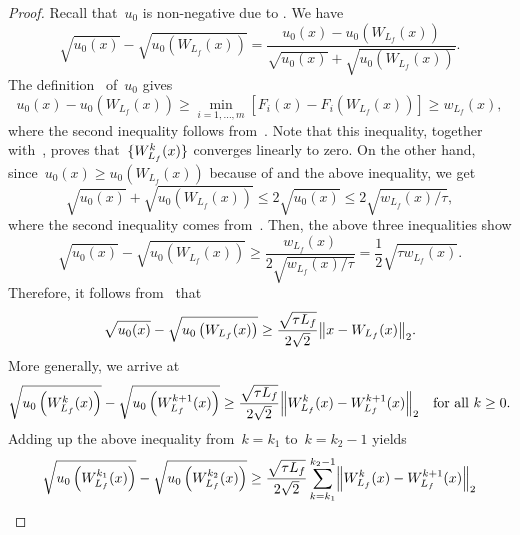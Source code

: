 \documentclass[../main]{subfiles}
\begin{document}
\begin{proof}
    Recall that~$u_0$ is non-negative due to .
    We have
    \begin{equation}
        \sqrt{u_0(x)} - \sqrt{u_0\left(W_{L_f}(x)\right)} = \frac{u_0(x) - u_0\left(W_{L_f}(x)\right)}{\sqrt{u_0(x)} + \sqrt{u_0\left(W_{L_f}(x)\right)}}
    .\end{equation}
    The definition~ of~$u_0$ gives
    \begin{equation}
        u_0(x) - u_0\left(W_{L_f}(x)\right) \ge \min_{i = 1, \dots, m} [F_i(x) - F_i\left(W_{L_f}(x)\right)] \ge w_{L_f}(x)
    ,\end{equation}
    where the second inequality follows from~.
    Note that this inequality, together with~, proves that~$\lbrace W_{L_f}^k(x)\rbrace$ converges linearly to zero.
    On the other hand, since~$u_0(x) \ge u_0\left(W_{L_f}(x)\right)$ because of  and the above inequality, we get
    \begin{equation}
        \sqrt{u_0(x)} + \sqrt{u_0\left(W_{L_f}(x)\right)} \le 2 \sqrt{u_0(x)} \le 2 \sqrt{w_{L_f}(x) / \tau}
    ,\end{equation}
    where the second inequality comes from~.
    Then, the above three inequalities show
    \begin{equation}
        \sqrt{u_0(x)} - \sqrt{u_0\left(W_{L_f}(x)\right)} \ge \frac{w_{L_f}(x)}{2 \sqrt{w_{L_f}(x) / \tau}} = \frac{1}{2} \sqrt{\tau w_{L_f}(x)}
    .\end{equation}
    Therefore, it follows from~ that
    \begin{equation}
        \sqrt{u_0(x)} - \sqrt{u_0\left(W_{L_f}(x)\right)} \ge \frac{\sqrt{\tau L_f}}{2 \sqrt{2}} \norm*{x - W_{L_f}(x)}_2
    .\end{equation}
    More generally, we arrive at
    \begin{equation}
        \sqrt{u_0\left(W_{L_f}^k(x)\right)} - \sqrt{u_0\left(W_{L_f}^{k + 1}(x)\right)} \ge \frac{\sqrt{\tau L_f}}{2 \sqrt{2}} \norm*{W_{L_f}^k(x) - W_{L_f}^{k + 1}(x)}_2 \forallcondition{k \ge 0}
    .\end{equation}
    Adding up the above inequality from~$k = k_1$ to~$k = k_2 - 1$ yields
    \begin{equation}
        \sqrt{u_0\left(W_{L_f}^{k_1}(x)\right)} - \sqrt{u_0\left(W_{L_f}^{k_2}(x)\right)} \ge \frac{\sqrt{\tau L_f}}{2 \sqrt{2}} \sum_{k = k_1}^{k_2 - 1} \norm*{W_{L_f}^k(x) - W_{L_f}^{k + 1}(x)}_2

\end{equation}
\end{proof}
\end{document}
